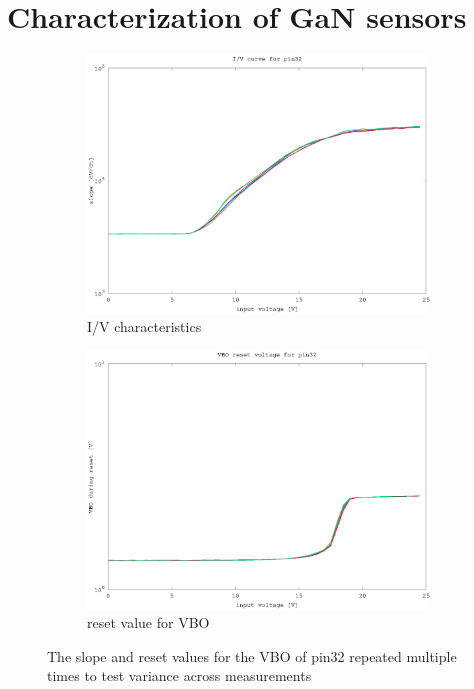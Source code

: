 \section{Characterization of GaN sensors}

\begin{figure}[h]
	\centering
	\begin{subfigure}[b]{0.475\textwidth}
	    \centering
	    \includegraphics[width=\textwidth]{fig/pin32_slope_0-25V.eps}
	    \caption[Network2]%
	    {I/V characteristics}    
	    \label{fig:pin32_slope}
	\end{subfigure}
	\hfill
	\begin{subfigure}[b]{0.475\textwidth}  
	    \centering 
	    \includegraphics[width=\textwidth]{fig/pin32_reset_0-25V.eps}
	    \caption[]%
	    {reset value for VBO}    
	    \label{fig:pin32_reset}
	\end{subfigure}
	\caption{The slope and reset values for the VBO of pin32 repeated multiple times to test variance across measurements}
	\label{fig:pin32}
\end{figure}

